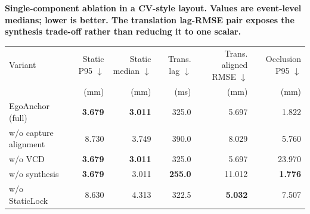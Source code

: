 \documentclass[border=8pt]{standalone}
\begin{document}
\begin{minipage}{0.99\textwidth}

\centering
\par\smallskip\textbf{Single-component ablation in a CV-style layout. Values are event-level medians; lower is better. The translation lag-RMSE pair exposes the synthesis trade-off rather than reducing it to one scalar.}

\setlength{\tabcolsep}{7pt}
\renewcommand{\arraystretch}{1.10}
\begin{tabular}{lrrrrr}
\toprule
Variant
& Static P95 $\downarrow$
& Static median $\downarrow$
& Trans. lag $\downarrow$
& Trans. aligned RMSE $\downarrow$
& Occlusion P95 $\downarrow$ \\
& (mm) & (mm) & (ms) & (mm) & (mm) \\
\midrule
EgoAnchor (full) & \textbf{3.679} & \textbf{3.011} & 325.0 & 5.697 & 1.822 \\
w/o capture alignment & 8.730 & 3.749 & 390.0 & 8.029 & 5.760 \\
w/o VCD & \textbf{3.679} & \textbf{3.011} & 325.0 & 5.697 & 23.970 \\
w/o synthesis & \textbf{3.679} & 3.011 & \textbf{255.0} & 11.012 & \textbf{1.776} \\
w/o StaticLock & 8.630 & 4.313 & 322.5 & \textbf{5.032} & 7.507 \\
\bottomrule
\end{tabular}

\end{minipage}
\end{document}
